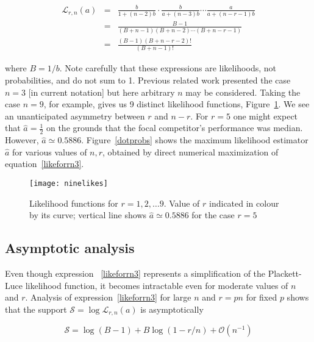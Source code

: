 \documentclass[article]{ajs}
\begin{document}
\begin{eqnarray}\label{likeforrn1}
  \mathcal{L}_{r,n}(a) &=&
\frac{b}{1+ (n-2)b}\cdot
\frac{b}{a+(n-3)b}\cdots\frac{a}{a+(n-r-1)b}\nonumber\\
&=& \frac{B-1}{(B+n-1)(B+n-2)\cdots(B+n-r-1)}\nonumber\\ 
&=& \frac{(B-1)(B+n-r-2)!}{(B+n-1)!}\label{likeforrn3}
\end{eqnarray}

\noindent where $B=1/b$.  Note carefully that these expressions are
likelihoods, not probabilities, and do not sum to 1.  Previous related
work \citep{hankin2024_hyper3} presented the case $n=3$ [in current
  notation] but here arbitrary $n$ may be considered.  Taking the case
$n=9$, for example, gives us 9 distinct likelihood functions,
Figure~\ref{ninelikes}.  We see an unanticipated asymmetry between $r$
and $n-r$.  For $r=5$ one might expect that $\hat{a}=\frac{1}{2}$ on
the grounds that the focal competitor's performance was median.
However, $\hat{a}\simeq 0.5886$.  Figure~\ref{dotprobs} shows the
maximum likelihood estimator $\hat{a}$ for various values of $n,r$,
obtained by direct numerical maximization of
equation~\ref{likeforrn3}.

\begin{figure}[t]
  \begin{centering}
\texttt{[image: ninelikes]}  %
\caption{Likelihood functions for $r=1,2,\ldots 9$\label{ninelikes}.  Value
  of $r$ indicated in colour by its curve; vertical line shows
  $\hat{a}\simeq 0.5886$ for the case $r=5$}
\end{centering}
\end{figure}


\subsection{Asymptotic analysis}

Even though expression ~\ref{likeforrn3} represents a simplification
of the Plackett-Luce likelihood function, it becomes intractable even
for moderate values of $n$ and $r$.  Analysis of
expression~\ref{likeforrn3} for large $n$ and $r=pn$ for fixed $p$
shows that the support $\mathcal{S}=\log\mathcal{L}_{r,n}(a)$ is
asymptotically

\begin{equation}\label{asymptotic}
\mathcal{S}=
\log(B-1) + B\log(1-r/n)
+\mathcal{O}\left(n^{-1}\right)
\end{equation}
\end{document}
